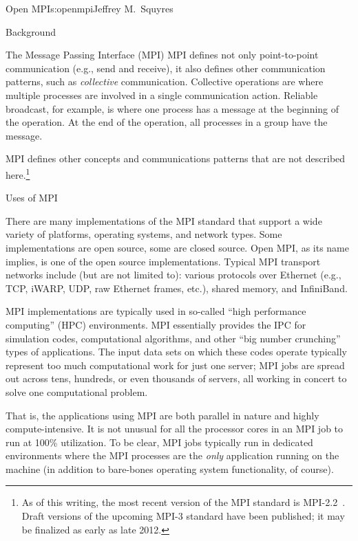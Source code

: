 \begin{aosachapter}{Open MPI}{s:openmpi}{Jeffrey M.\ Squyres}
\begin{aosasect1}{Background}
\begin{aosasect2}{The Message Passing Interface (MPI)}
MPI defines not only point-to-point communication (e.g., send and
receive), it also defines other communication patterns, such as
\emph{collective} communication.  Collective operations are where
multiple processes are involved in a single communication action.
Reliable broadcast, for example, is where one process has a message at
the beginning of the operation. At the end of the operation, all
processes in a group have the message.

MPI defines other concepts and communications patterns that are not
described here.\footnote{As of this writing, the most recent version
  of the MPI standard is MPI-2.2~\cite{bib:mpi-22}.  Draft versions of
  the upcoming MPI-3 standard have been published; it may be finalized
  as early as late 2012.}

\end{aosasect2}


\begin{aosasect2}{Uses of MPI}

There are many implementations of the MPI standard that support a
wide variety of platforms, operating systems, and network types.
Some implementations are open source, some are closed source.  
%
Open MPI, as its name implies, is one of the open source
implementations.
%
Typical MPI transport networks include (but are not limited to):
various protocols over Ethernet (e.g., TCP, iWARP, UDP, raw Ethernet
frames, etc.), shared memory, and InfiniBand.

MPI implementations are typically used in so-called ``high performance
computing'' (HPC) environments.  MPI essentially provides the IPC for
simulation codes, computational algorithms, and other ``big number
crunching'' types of applications.  The input data sets on which these
codes operate typically represent too much computational work for just
one server; MPI jobs are spread out across tens, hundreds, or even
thousands of servers, all working in concert to solve one
computational problem.

That is, the applications using MPI are both parallel in nature and
highly compute-intensive.  It is not unusual for all the processor
cores in an MPI job to run at 100\% utilization.  To be clear, MPI
jobs typically run in dedicated environments where the MPI processes
are the \emph{only} application running on the machine (in addition to
bare-bones operating system functionality, of course).


\end{aosasect2}
\end{aosasect1}
\end{aosachapter}
